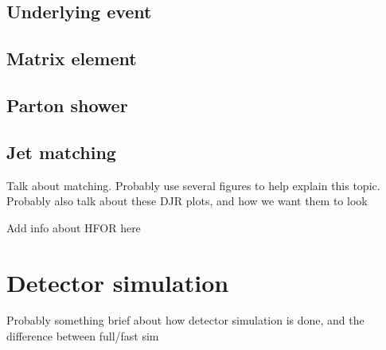\subsection{Underlying event}

\subsection{Matrix element}

\subsection{Parton shower}

\subsection{Jet matching}
\label{sec:jet_matching}

{\color{red} Talk about matching. Probably use several figures to help explain
  this topic. Probably also talk about these DJR plots, and how we want them
  to look}

{\color{red} Add info about HFOR here}

\section{Detector simulation}

{\color{red} Probably something brief about how detector simulation is done, and
  the difference between full/fast sim}


